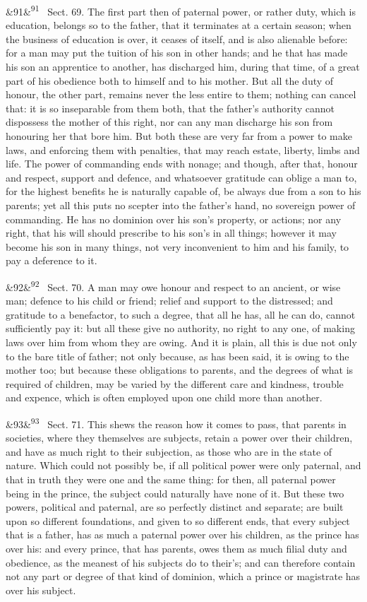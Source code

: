 \documentclass[12pt]{article}
\newcommand{\para}[1][]{\par\noindent\ifx&#1&\else\textsuperscript{\footnotesize #1}~\fi}
\begin{document}
\para[91] Sect. 69. The first part then of paternal power, or rather duty, which is education, belongs so to the father, that it terminates at a certain season; when the business of education is over, it ceases of itself, and is also alienable before: for a man may put the tuition of his son in other hands; and he that has made his son an apprentice to another, has discharged him, during that time, of a great part of his obedience both to himself and to his mother. But all the duty of honour, the other part, remains never the less entire to them; nothing can cancel that: it is so inseparable from them both, that the father's authority cannot dispossess the mother of this right, nor can any man discharge his son from honouring her that bore him. But both these are very far from a power to make laws, and enforcing them with penalties, that may reach estate, liberty, limbs and life. The power of commanding ends with nonage; and though, after that, honour and respect, support and defence, and whatsoever gratitude can oblige a man to, for the highest benefits he is naturally capable of, be always due from a son to his parents; yet all this puts no scepter into the father's hand, no sovereign power of commanding. He has no dominion over his son's property, or actions; nor any right, that his will should prescribe to his son's in all things; however it may become his son in many things, not very inconvenient to him and his family, to pay a deference to it.

\para[92] Sect. 70. A man may owe honour and respect to an ancient, or wise man; defence to his child or friend; relief and support to the distressed; and gratitude to a benefactor, to such a degree, that all he has, all he can do, cannot sufficiently pay it: but all these give no authority, no right to any one, of making laws over him from whom they are owing. And it is plain, all this is due not only to the bare title of father; not only because, as has been said, it is owing to the mother too; but because these obligations to parents, and the degrees of what is required of children, may be varied by the different care and kindness, trouble and expence, which is often employed upon one child more than another.

\para[93] Sect. 71. This shews the reason how it comes to pass, that parents in societies, where they themselves are subjects, retain a power over their children, and have as much right to their subjection, as those who are in the state of nature. Which could not possibly be, if all political power were only paternal, and that in truth they were one and the same thing: for then, all paternal power being in the prince, the subject could naturally have none of it. But these two powers, political and paternal, are so perfectly distinct and separate; are built upon so different foundations, and given to so different ends, that every subject that is a father, has as much a paternal power over his children, as the prince has over his: and every prince, that has parents, owes them as much filial duty and obedience, as the meanest of his subjects do to their's; and can therefore contain not any part or degree of that kind of dominion, which a prince or magistrate has over his subject.
\end{document}
